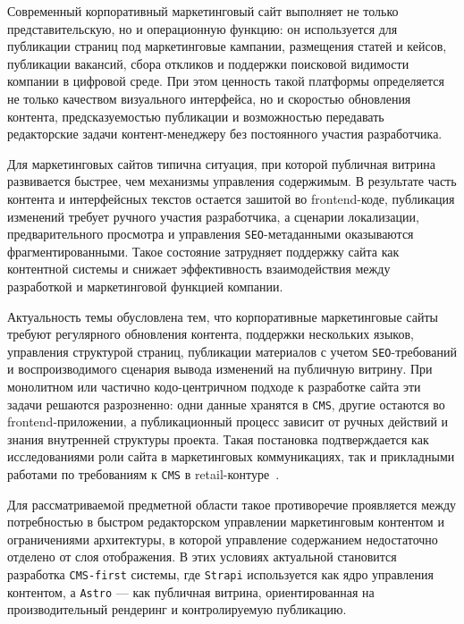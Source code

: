 Современный корпоративный маркетинговый сайт выполняет не только представительскую,
но и операционную функцию: он используется для публикации страниц под маркетинговые
кампании, размещения статей и кейсов, публикации вакансий, сбора откликов и поддержки
поисковой видимости компании в цифровой среде. При этом ценность такой платформы
определяется не только качеством визуального интерфейса, но и скоростью обновления
контента, предсказуемостью публикации и возможностью передавать редакторские задачи
контент-менеджеру без постоянного участия разработчика.

Для маркетинговых сайтов типична ситуация, при которой публичная витрина развивается
быстрее, чем механизмы управления содержимым. В результате часть контента и интерфейсных
текстов остается зашитой во frontend-коде, публикация изменений требует ручного участия
разработчика, а сценарии локализации, предварительного просмотра и управления
\texttt{SEO}-метаданными оказываются фрагментированными. Такое состояние затрудняет
поддержку сайта как контентной системы и снижает эффективность взаимодействия между
разработкой и маркетинговой функцией компании.


Актуальность темы обусловлена тем, что корпоративные маркетинговые сайты требуют
регулярного обновления контента, поддержки нескольких языков, управления структурой
страниц, публикации материалов с учетом \texttt{SEO}-требований и воспроизводимого
сценария вывода изменений на публичную витрину. При монолитном или частично
кодо-центричном подходе к разработке сайта эти задачи решаются разрозненно: одни данные
хранятся в \texttt{CMS}, другие остаются во frontend-приложении, а публикационный процесс
зависит от ручных действий и знания внутренней структуры проекта. Такая постановка
подтверждается как исследованиями роли сайта в маркетинговых коммуникациях, так и
прикладными работами по требованиям к \texttt{CMS} в retail-контуре~\cite{torgunakova2023marketing-website,voroniuk2020retail-cms-needs}.

Для рассматриваемой предметной области такое противоречие проявляется между потребностью
в быстром редакторском управлении маркетинговым контентом и ограничениями архитектуры,
в которой управление содержанием недостаточно отделено от слоя отображения. В этих
условиях актуальной становится разработка \texttt{CMS-first} системы, где \texttt{Strapi}
используется как ядро управления контентом, а \texttt{Astro} --- как публичная витрина,
ориентированная на производительный рендеринг и контролируемую публикацию.


